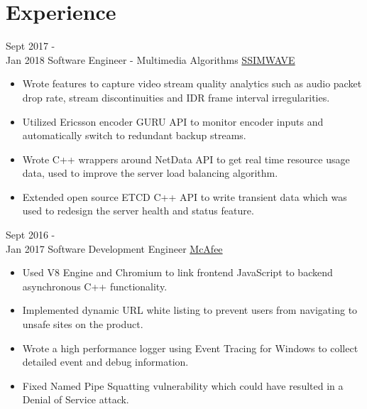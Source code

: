 \documentclass[letterpaper]{twentysecondcv} %
\begin{document}
\makeprofile %



\section{Experience}

\begin{twenty} %
		\twentyitem
    	{Sept 2017 -\\Jan 2018}
        {Software Engineer - Multimedia Algorithms}
        {\href{https://www.ssimwave.com}{SSIMWAVE}}
        {}
        {
        {\begin{itemize}
        \item Wrote features to capture video stream quality analytics such as audio packet drop rate, stream discontinuities and IDR frame interval irregularities.
        \item Utilized Ericsson encoder GURU API to monitor encoder inputs and automatically switch to redundant backup streams.
        \item Wrote C++ wrappers around NetData API to get real time resource usage data, used to improve the server load balancing algorithm.
        \item Extended open source ETCD C++ API to write transient data which was used to redesign the server health and status feature.
    \end{itemize}}
        }

	\twentyitem
    	{Sept 2016 - \\Jan 2017}
        {Software Development Engineer}
        {\href{https://www.mcafee.com/ca/index.html}{McAfee}}
        {}
        {
        {\begin{itemize}
        \item Used V8 Engine and Chromium to link frontend JavaScript to backend asynchronous C++ functionality.
        \item Implemented dynamic URL white listing to prevent users from navigating to unsafe sites on the product.
        \item Wrote a high performance logger using Event Tracing for Windows to collect detailed event and debug information.
        \item Fixed Named Pipe Squatting vulnerability which could have resulted in a Denial of Service attack.
    \end{itemize}}
        }
        

\end{twenty}
\end{document}

